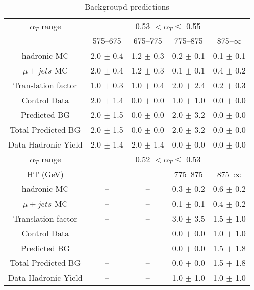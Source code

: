 \documentclass[a4paper,12pt]{article}
\begin{document}
\begin{table}[htl] 
\caption{Backgroupd predictions}
 \begin{flushleft}
 \begin{tabular}{ c|cccc }
\hline
\hline
 $ \alpha_T $ range  &  \multicolumn{4}{c}{0.53 $ < \alpha_T \leq $ 0.55}\\ 
  & 575--675 & 675--775 & 775--875 & 875--$\infty$ \\ 
 \hline
hadronic MC & 2.0 $\pm$ 0.4  & 1.2 $\pm$ 0.3  & 0.2 $\pm$ 0.1  & 0.1 $\pm$ 0.1 \\ 
$\mu + jets$ MC & 2.0 $\pm$ 0.4  & 1.2 $\pm$ 0.3  & 0.1 $\pm$ 0.1  & 0.4 $\pm$ 0.2 \\ 
Translation factor & 1.0 $\pm$ 0.3  & 1.0 $\pm$ 0.4  & 2.0 $\pm$ 2.4  & 0.2 $\pm$ 0.3 \\ 
Control Data & 2.0 $\pm$ 1.4  & 0.0 $\pm$ 0.0  & 1.0 $\pm$ 1.0  & 0.0 $\pm$ 0.0 \\ 
Predicted BG & 2.0 $\pm$ 1.5  & 0.0 $\pm$ 0.0  & 2.0 $\pm$ 3.2  & 0.0 $\pm$ 0.0 \\ 
\hline
Total Predicted BG & 2.0 $\pm$ 1.5  & 0.0 $\pm$ 0.0  & 2.0 $\pm$ 3.2  & 0.0 $\pm$ 0.0 \\ 
Data Hadronic Yield & 2.0 $\pm$ 1.4  & 2.0 $\pm$ 1.4  & 0.0 $\pm$ 0.0  & 0.0 $\pm$ 0.0 \\ 
\hline
\hline
 $ \alpha_T $ range &  \multicolumn{4}{c}{0.52 $ < \alpha_T \leq $ 0.53}\\ 
  HT (GeV) &  &  & 775--875 & 875--$\infty$ \\ 
 \hline
hadronic MC & --  & --  & 0.3 $\pm$ 0.2  & 0.6 $\pm$ 0.2 \\ 
$\mu + jets$ MC & --  & --  & 0.1 $\pm$ 0.1  & 0.4 $\pm$ 0.2 \\ 
Translation factor & --  & --  & 3.0 $\pm$ 3.5  & 1.5 $\pm$ 1.0 \\ 
Control Data & --  & --  & 0.0 $\pm$ 0.0  & 1.0 $\pm$ 1.0 \\ 
Predicted BG & --  & --  & 0.0 $\pm$ 0.0  & 1.5 $\pm$ 1.8 \\ 
\hline
Total Predicted BG & --  & --  & 0.0 $\pm$ 0.0  & 1.5 $\pm$ 1.8 \\ 
Data Hadronic Yield & --  & --  & 1.0 $\pm$ 1.0  & 1.0 $\pm$ 1.0 \\ 
\hline
 \end{tabular}
 \end{flushleft}
\label{tab:bg-esti-normal}
 \end{table}
\end{document}
